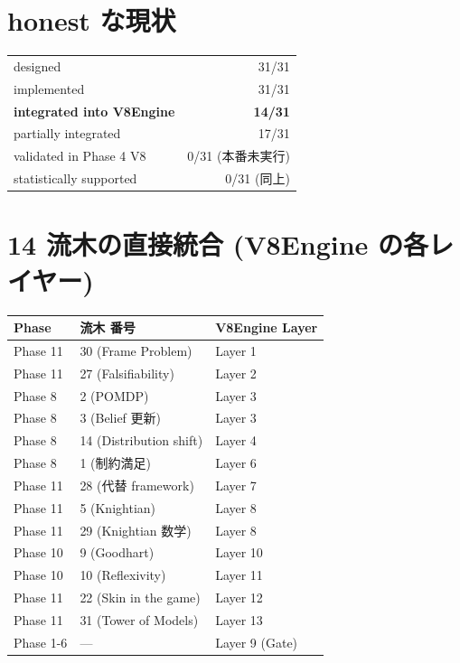 \documentclass[a4paper,11pt]{report}
\begin{document}
\section{honest な現状}

\begin{summary}
\begin{tabular}{lr}
designed & 31/31 \\
implemented & 31/31 \\
\textbf{integrated into V8Engine} & \textbf{14/31} \\
partially integrated & 17/31 \\
validated in Phase 4 V8 & 0/31 (本番未実行) \\
statistically supported & 0/31 (同上) \\
\end{tabular}
\end{summary}

\section{14 流木の直接統合 (V8Engine の各レイヤー)}

\begin{longtable}{l l l}
\toprule
Phase & 流木 番号 & V8Engine Layer \\
\midrule
Phase 11 & 30 (Frame Problem) & Layer 1 \\
Phase 11 & 27 (Falsifiability) & Layer 2 \\
Phase 8 & 2 (POMDP) & Layer 3 \\
Phase 8 & 3 (Belief 更新) & Layer 3 \\
Phase 8 & 14 (Distribution shift) & Layer 4 \\
Phase 8 & 1 (制約満足) & Layer 6 \\
Phase 11 & 28 (代替 framework) & Layer 7 \\
Phase 11 & 5 (Knightian) & Layer 8 \\
Phase 11 & 29 (Knightian 数学) & Layer 8 \\
Phase 10 & 9 (Goodhart) & Layer 10 \\
Phase 10 & 10 (Reflexivity) & Layer 11 \\
Phase 11 & 22 (Skin in the game) & Layer 12 \\
Phase 11 & 31 (Tower of Models) & Layer 13 \\
Phase 1-6 & — & Layer 9 (Gate) \\
\bottomrule
\end{longtable}
\end{document}
